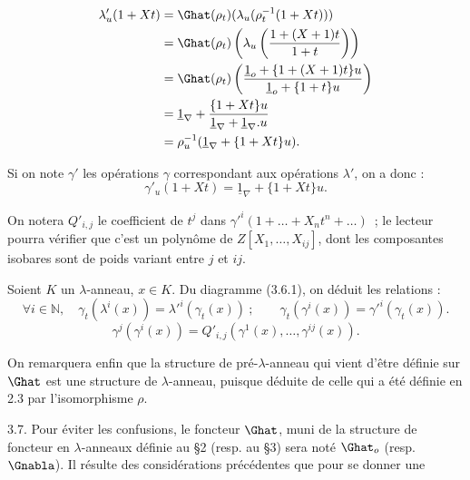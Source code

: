 
\[
\begin{aligned}
\lambda'_u(1+Xt) &=\Ghat(\rho_t)(\lambda_u(\rho_t^{-1}(1+Xt)))\\
&=\Ghat(\rho_t)\left(\lambda_u\left(\frac{1+(X+1)t}{1+t}\right)\right)\\
&=\Ghat(\rho_t)\left(\frac{\underline{1}_o+\{1+(X+1)t\}u}{\underline{1}_o+\{1+t\}u}\right)\\
&=\underline{1}_\nabla+\frac{\{1+Xt\}u}{\underline{1}_\nabla+\underline{1}_\nabla.u}\\
&=\rho_u^{-1}(\underline{1}_\nabla+\{1+Xt\}u).
\end{aligned}
\]

Si on note \(\gamma'\) les opérations \(\gamma\) correspondant aux opérations \(\lambda'\), on a donc :
\begin{equation}\tag{3.6.2}
  \gamma'_u(1+Xt)=\underline{1}_\nabla+\{1+Xt\}u .
\end{equation}

On notera \(Q'_{i,j}\) le coefficient de \(t^j\) dans \(\gamma'^i(1+\ldots+X_nt^n+\ldots)\)~; le lecteur pourra vérifier que c'est un polynôme de \(Z[X_1,\ldots,X_{ij}]\), dont les composantes isobares sont de poids variant entre \(j\) et \(ij\).

Soient \(K\) un \(\lambda\)-anneau, \(x\in K\). Du diagramme (3.6.1), on déduit les relations :
\begin{equation}\tag{3.6.3}
  \forall i\in\mathbb N,\quad\gamma_t(\lambda^i(x))=\lambda'^i(\gamma_t(x))~;
  \qquad
  \gamma_t(\gamma^i(x))=\gamma'^i(\gamma_t(x)).
\end{equation}
\begin{equation}\tag{3.6.4}
  \gamma^j(\gamma^i(x))
  =Q'_{i,j}(\gamma^1(x),\ldots,\gamma^{ij}(x)).
\end{equation}

On remarquera enfin que la structure de pré-\(\lambda\)-anneau qui vient d'être définie sur \(\Ghat\) est une structure de \(\lambda\)-anneau, puisque déduite de celle qui a été définie en 2.3 par l'isomorphisme \(\rho\).

3.7. Pour éviter les confusions, le foncteur \(\Ghat\), muni de la structure de foncteur en \(\lambda\)-anneaux définie au §2 (resp. au §3) sera noté \(\Ghat_o\) (resp. \(\Gnabla\)). Il résulte des considérations précédentes que pour se donner une
